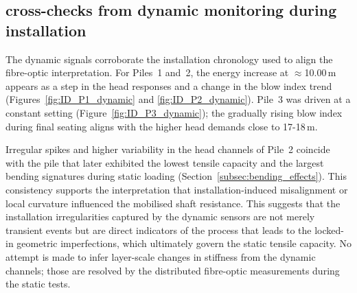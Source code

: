 {{{{{{%
	


\subsection{cross-checks from dynamic monitoring during installation}

The dynamic signals corroborate the installation chronology used to align the fibre-optic interpretation.
For Piles~1 and~2, the energy increase at $\approx$10.00\,m appears as a step in the head responses and a change in the blow index trend (Figures~\ref{fig:ID_P1_dynamic} and \ref{fig:ID_P2_dynamic}).
Pile~3 was driven at a constant setting (Figure~\ref{fig:ID_P3_dynamic}); the gradually rising blow index during final seating aligns with the higher head demands close to 17-18\,m.

Irregular spikes and higher variability in the head channels of Pile~2 coincide with the pile that later exhibited the lowest tensile capacity and the largest bending signatures during static loading (Section~\ref{subsec:bending_effects}).
This consistency supports the interpretation that installation-induced misalignment or local curvature influenced the mobilised shaft resistance. This suggests that the installation irregularities captured by the dynamic sensors are not merely transient events but are direct indicators of the process that leads to the locked-in geometric imperfections, which ultimately govern the static tensile capacity.
No attempt is made to infer layer-scale changes in stiffness from the dynamic channels; those are resolved by the distributed fibre-optic measurements during the static tests.



}}}}}}
